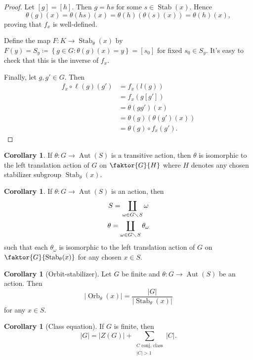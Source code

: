 \documentclass[10pt,letterpaper,cm]{nupset}
\theoremstyle{definition}
\theoremstyle{theorem}
\newtheorem{corollary}[definition]{Corollary}
\theoremstyle{remark}
\newcommand{\1}{\mathbf{1}}
\newcommand{\0}{\vec 0}
\DeclareMathOperator{\aut}{Aut}
\DeclareMathOperator{\stab}{Stab}
\DeclareMathOperator{\orb}{Orb}
\begin{document}
\begin{proof}
Let $[g] = [h]$. Then $g = hs$ for some $s \in \stab(x)$. Hence $$\theta(g)(x) = \theta(hs)(x) = \theta(h)(\theta(s)(x)) = \theta(h)(x),$$ proving that $f_x$ is well-defined.

Define the map $F: K \to \stab_\theta(x)$ by $F(y) = S_y \coloneqq  \left\{g \in G : \theta(g)(x) = y\right\} = [s_0]$ for fixed $s_0 \in S_y$.
It's easy to check that this is the inverse of $f_x$. 

Finally, let $g, g'\in G$. Then 
\begin{align*} f_x \circ \ell(g)(g') & = f_x(l(g)) \\ & = f_x(g[g'])  \\ & = \theta(gg')(x) 
 \\ & = \theta(g)(\theta(g')(x))\\ &  = \theta(g) \circ f_x(g').
\end{align*}
\end{proof}

\begin{corollary}
If $\theta : G \to \aut(S)$ is a transitive action, then $\theta$ is isomorphic to the left translation action of $G$ on $\faktor{G}{H}$ where $H$ denotes any chosen stabilizer subgroup $ \stab_{\theta}(x)$.
\end{corollary}

\begin{corollary}
If $\theta : G \to \aut(S)$ is an action, then 
\begin{gather*}
S = \coprod_{\omega \in G\diagdown S}\omega
\\ \theta = \coprod_{\omega \in G \diagdown S} \theta_{\omega}
\end{gather*}
such that each $\theta_{\omega}$ is isomorphic to the left translation action of $G$ on $\faktor{G}{\stab_{\theta}(x)}$ for any chosen $x\in S$. 
\end{corollary}

\begin{corollary}[Orbit-stabilizer]
Let $G$ be  finite  and $\theta : G \to \aut(S)$ be an action. Then $$ \lvert{\orb_{\theta}(x)}\rvert = \frac{\lvert{G}\rvert}{\lvert{\stab_{\theta}(x)}\rvert}     $$ for any $x\in S$. 
\end{corollary}

\begin{corollary}[Class equation]
If $G$ is finite, then $$\lvert{G}\rvert = \lvert{Z(G)}\rvert + \sum_{{\substack{C \text{ conj. class} \\ \lvert{C}\rvert >1}}} \lvert{C}\rvert     .$$
\end{corollary}
\end{document}
